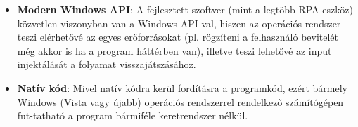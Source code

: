 \begin{itemize}
	\item \textbf{Modern Windows API}: A fejlesztett szoftver (mint a legtöbb RPA eszköz) közvetlen viszonyban van a Windows API-val, hiszen az operációs rendszer teszi elérhetővé az egyes erőforrásokat (pl. rögzíteni a felhasználó bevitelét még akkor is ha a program háttérben van), illetve teszi lehetővé az input injektálását a folyamat visszajátszásához.
	\item \textbf{Natív kód}: Mivel natív kódra kerül fordításra a programkód, ezért bármely Windows (Vista vagy újabb) operációs rendszerrel rendelkező számítógépen fut\hyp{}tatható a program bármiféle keretrendszer nélkül.
\end{itemize}















